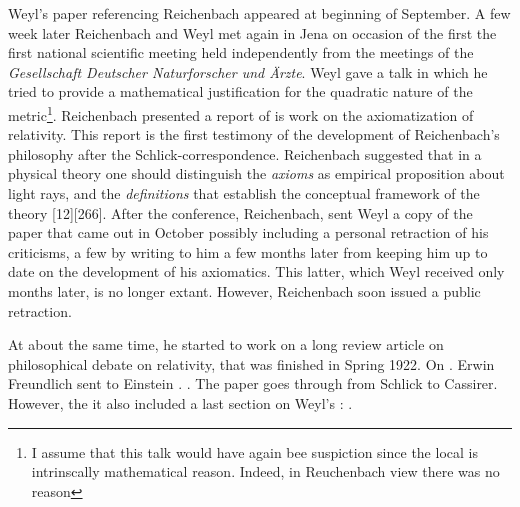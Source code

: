 \documentclass[draft]{article}
\begin{document}
Weyl's paper referencing Reichenbach appeared at beginning of September. A few week later Reichenbach and Weyl met again in Jena on occasion of the first   the first national scientific meeting held independently from the meetings of the \textit{Gesellschaft Deutscher Naturforscher und Ärzte}. Weyl gave a talk in which he tried to provide a mathematical justification for the quadratic nature of the metric\footnote{I assume that this talk would have again bee suspiction since the local is intrinscally mathematical reason. Indeed, in Reuchenbach view there was no reason}. Reichenbach presented a report of is work on the axiomatization of relativity. This report is the first testimony of the development of Reichenbach's philosophy after the Schlick-correspondence. Reichenbach suggested that in a physical theory one should distinguish the \emph{axioms} as empirical proposition about light rays, \rac\etc and the \emph{definitions} that establish the conceptual framework of the theory [12][266]. After the conference, Reichenbach, sent Weyl a copy of the paper that came out in October \citep{Reichenbach1921d} possibly including a personal retraction of his criticisms, a few by writing to him a few months later from  keeping him up to date on the development of his axiomatics. This latter, which Weyl received only months later, is no longer extant. However, Reichenbach soon issued a public retraction. 

At about the same time, he started to work on a long review article on philosophical debate on relativity, that was finished in Spring 1922. On . Erwin Freundlich sent to Einstein . . The paper goes through from Schlick to Cassirer. However, the it also included a last section on Weyl's \uft:  \citep{Reichenbach1922a}.
\end{document}
